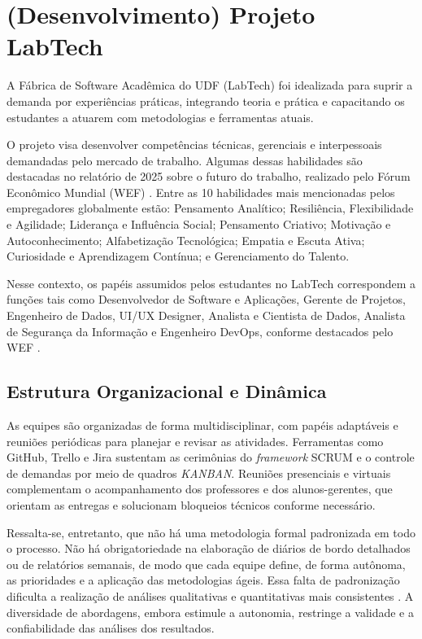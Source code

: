 \documentclass[
	12pt,           %
	openright,      %
	oneside,        %
	a4paper,        %
	brazil          %
]{abntex2}
\begin{document}
\chapter{(Desenvolvimento) Projeto LabTech}
\label{sec:desenvolvimento}

A Fábrica de Software Acadêmica do UDF (LabTech) foi idealizada para suprir a demanda por experiências práticas, integrando teoria e prática e capacitando os estudantes a atuarem com metodologias e ferramentas atuais.

O projeto visa desenvolver competências técnicas, gerenciais e interpessoais demandadas pelo mercado de trabalho. Algumas dessas habilidades são destacadas no relatório de 2025 sobre o futuro do trabalho, realizado pelo Fórum Econômico Mundial (WEF) \cite{wef:2025}. Entre as 10 habilidades mais mencionadas pelos empregadores globalmente estão: Pensamento Analítico; Resiliência, Flexibilidade e Agilidade; Liderança e Influência Social; Pensamento Criativo; Motivação e Autoconhecimento; Alfabetização Tecnológica; Empatia e Escuta Ativa; Curiosidade e Aprendizagem Contínua; e Gerenciamento do Talento.

Nesse contexto, os papéis assumidos pelos estudantes no LabTech correspondem a funções tais como Desenvolvedor de Software e Aplicações, Gerente de Projetos, Engenheiro de Dados, UI/UX Designer, Analista e Cientista de Dados, Analista de Segurança da Informação e Engenheiro DevOps, conforme destacados pelo WEF \cite{wef:2025}.

\section{Estrutura Organizacional e Dinâmica}

As equipes são organizadas de forma multidisciplinar, com papéis adaptáveis e reuniões periódicas para planejar e revisar as atividades. Ferramentas como GitHub, Trello e Jira sustentam as cerimônias do \emph{framework} SCRUM e o controle de demandas por meio de quadros \emph{KANBAN}. Reuniões presenciais e virtuais complementam o acompanhamento dos professores e dos alunos-gerentes, que orientam as entregas e solucionam bloqueios técnicos conforme necessário.

Ressalta-se, entretanto, que não há uma metodologia formal padronizada em todo o processo. Não há obrigatoriedade na elaboração de diários de bordo detalhados ou de relatórios semanais, de modo que cada equipe define, de forma autônoma, as prioridades e a aplicação das metodologias ágeis. Essa falta de padronização dificulta a realização de análises qualitativas e quantitativas mais consistentes \cite{mineiro2022pesquisa}. A diversidade de abordagens, embora estimule a autonomia, restringe a validade e a confiabilidade das análises dos resultados.
\end{document}
